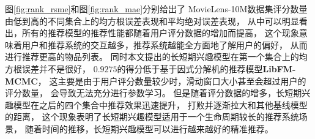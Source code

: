 图\ref{fig:rank_rsme}和图\ref{fig:rank_mae}分别给出了
MovieLens-10M数据集评分数量由低到高的不同集合上的均方根误差表现和平均绝对误差表现，
从中可以明显看出，所有的推荐模型的推荐性能都随着用户评分数据的增加而提高，
这个现象意味着用户和推荐系统的交互越多，推荐系统越能全方面地了解用户的偏好，
从而进行推荐更高的物品列表。
同时本文提出的长短期兴趣模型在第一个集合上的均方根误差并不是很好，
$0.9275$的得分低于基于因式分解机的推荐模型\textbf{LibFM-MCMC}，
这主要是由于用户评分数量较少时，滑动窗口大小甚至会超过用户的评分数量，
会导致无法充分进行参数学习。
但是随着评分数据的增多，长短期兴趣模型在之后的四个集合中推荐效果迅速提升，
打败并逐渐拉大和其他基线模型的距离，
这个现象表明了长短期兴趣模型适用于一个生命周期较长的推荐系统场景，
随着时间的推移，长短期兴趣模型可以进行越来越好的精准推荐。


